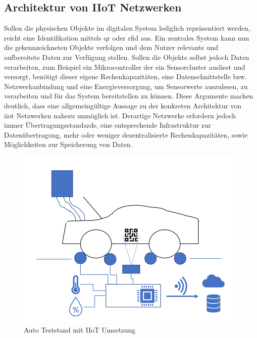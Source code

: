 \subsection{Architektur von IIoT Netzwerken}
Sollen die physischen Objekte im digitalen System lediglich repräsentiert werden, reicht eine Identifikation mittels \ac{qr} oder \ac{rfid} aus. Ein zentrales System kann nun die gekennzeichneten Objekte verfolgen und dem Nutzer relevante und aufbereitete Daten zur Verfügung stellen.
Sollen die Objekte selbst jedoch Daten verarbeiten, zum Beispiel ein Mikrocontroller der ein Sensorcluster ausliest und versorgt, benötigt dieser eigene Rechenkapazitäten, eine Datenschnittstelle bzw. Netzwerkanbindung und eine Energieversorgung, um Sensorwerte auszulesen, zu verarbeiten und für das System bereitstellen zu können. Diese Argumente machen deutlich, dass eine allgemeingültige Aussage zu der konkreten Architektur von \ac{iiot} Netzwerken nahezu unmöglich ist.
Derartige Netzwerke erfordern jedoch immer Übertragungsstandards, eine entsprechende Infrastruktur zur Datenübertragung, mehr oder weniger dezentralisierte Rechenkapazitäten, sowie Möglichkeiten zur Speicherung von Daten.
\begin{figure}[H]
    \begin{center}
        \includegraphics[width=\linewidth]{images/beispiel_iiot.png}
        \caption[Beispiel IIoT]{Auto Teststand mit IIoT Umsetzung}
        \label{fi:auto_iiot}
    \end{center}
\end{figure}
